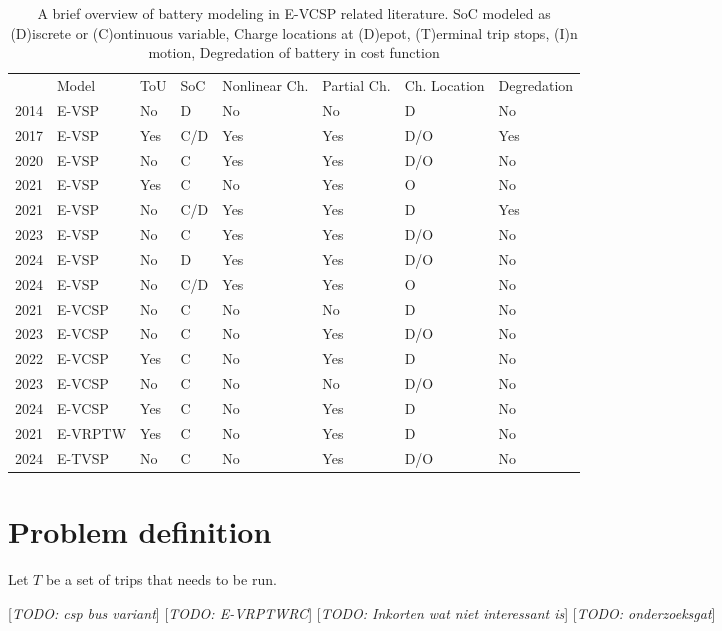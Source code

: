 \documentclass[ht]{article}
\newcommand{\todo}[1]{{\color{red}[\textit{TODO: #1}]}}
\begin{document}
\begin{table}[h]
  \centering
  \begin{tabular}{clllllll}
    \toprule
                                     & Model   & ToU & SoC & Nonlinear Ch. & Partial Ch. & Ch. Location & Degredation \\
    \cmidrule(lr){2-8}
    \cite{Li2014} 2014               & E-VSP   & No  & D   & No            & No          & D            & No          \\
    \cite{vanKootenNiekerk2017} 2017 & E-VSP   & Yes & C/D & Yes           & Yes         & D/O          & Yes         \\
    \cite{Olsen2020} 2020            & E-VSP   & No  & C   & Yes           & Yes         & D/O          & No          \\
    \cite{Jiang2021} 2021            & E-VSP   & Yes & C   & No            & Yes         & O            & No          \\
    \cite{Zhang2021} 2021            & E-VSP   & No  & C/D & Yes           & Yes         & D            & Yes         \\
    \cite{Parmentier2023} 2023       & E-VSP   & No  & C   & Yes           & Yes         & D/O          & No          \\
    \cite{deVos2024} 2024            & E-VSP   & No  & D   & Yes           & Yes         & D/O          & No          \\
    \cite{Pulyassary2024} 2024       & E-VSP   & No  & C/D & Yes           & Yes         & O            & No          \\
    \addlinespace[0.4em]
    \cite{Perumal2021} 2021          & E-VCSP  & No  & C   & No            & No          & D            & No          \\
    \cite{Sistig2023} 2023           & E-VCSP  & No  & C   & No            & Yes         & D/O          & No          \\
    \cite{Wang2022} 2022             & E-VCSP  & Yes & C   & No            & Yes         & D            & No          \\
    \cite{Shen2023} 2023             & E-VCSP  & No  & C   & No            & No          & D/O          & No          \\
    \cite{Cong2024} 2024             & E-VCSP  & Yes & C   & No            & Yes         & D            & No          \\
    \addlinespace[0.4em]
    \cite{Ham2021} 2021              & E-VRPTW & Yes & C   & No            & Yes         & D            & No          \\
    \cite{Stadnichuk2024} 2024       & E-TVSP  & No  & C   & No            & Yes         & D/O          & No          \\
    \bottomrule
  \end{tabular}
  \caption{A brief overview of battery modeling in E-VCSP related literature. SoC modeled as (D)iscrete or (C)ontinuous variable, Charge locations at (D)epot, (T)erminal trip stops, (I)n motion, Degredation of battery in cost function}
  \label{tab:eVCSP-lit}
\end{table}

\section{Problem definition}
\label{sec:problem_def}
Let $T$ be a set of trips that needs to be run.

\todo{csp bus variant}
\todo{E-VRPTWRC}
\todo{Inkorten wat niet interessant is}
\todo{onderzoeksgat}
\printbibliography
\end{document}
